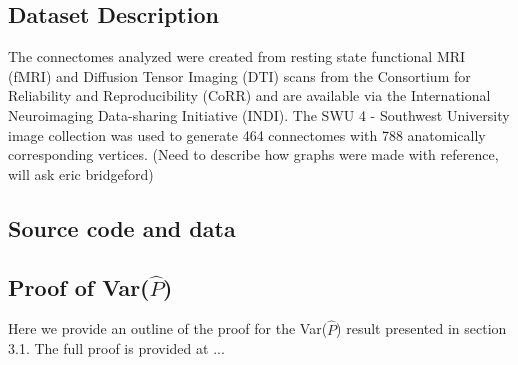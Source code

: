 	\subsection{Dataset Description}
	The connectomes analyzed were created from resting state functional MRI (fMRI) and Diffusion Tensor Imaging (DTI) scans from the Consortium for Reliability and Reproducibility (CoRR) and are available via the International Neuroimaging Data-sharing Initiative (INDI).  The SWU 4 - Southwest University image collection was used to generate 464 connectomes with 788 anatomically corresponding vertices.  (Need to describe how graphs were made with reference, will ask eric bridgeford)
	\subsection{Source code and data}
	\subsection{Proof of Var($\hat{P}$)}
	Here we provide an outline of the proof for the Var($\hat{P}$) result presented in section 3.1.  The full proof is provided at ...
